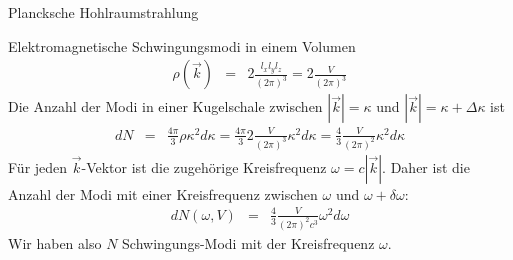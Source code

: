 \begin{chapter}{\titlestr}
\begin{section}{Plancksche Hohlraumstrahlung}
\begin{subsection}{Elektromagnetische Schwingungsmodi in einem Volumen}
\begin{eqnarray*}
\rho(\vec{k}) &=& 2\frac{l_xl_yl_z}{(2\pi)^3}=2\frac{V}{(2\pi)^3}
\end{eqnarray*}
Die Anzahl der Modi in einer Kugelschale
zwischen $|\vec{k}|=\kappa$ und $|\vec{k}|=\kappa +\Delta\kappa$ ist
\begin{eqnarray*}
d N &=& \frac{4\pi}{3}\rho \kappa^2 d\kappa=\frac{4\pi}{3}2\frac{V}{(2\pi)^3} \kappa^2 d\kappa
=\frac{4}{3}\frac{V}{(2\pi)^2} \kappa^2 d\kappa
\end{eqnarray*}
Für jeden $\vec{k}$-Vektor ist die zugehörige Kreisfrequenz $\omega = c|\vec{k}|$. Daher ist die Anzahl der Modi mit einer Kreisfrequenz zwischen $\omega$ und $\omega+\delta \omega$:
\begin{eqnarray}
\label{state_density}
d N(\omega,V) &=& \frac{4}{3}\frac{V}{(2\pi)^2c^3} \omega^2 d\omega
\end{eqnarray}
Wir haben also $N$ Schwingungs-Modi mit der Kreisfrequenz $\omega$.
\end{subsection}


\end{section}
\end{chapter}
